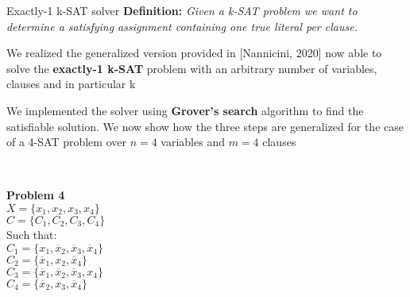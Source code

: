 		\begin{frame}{Exactly-1 k-SAT solver}
			\small
			\textbf{Definition:} \emph{Given a k-SAT problem we want to determine a satisfying assignment containing one true literal per clause.\\}
			
			\vspace{0.3cm}
			
			We realized the generalized version provided in [Nannicini, 2020] now able to solve the \textbf{exactly-1 k-SAT} problem with an arbitrary number of variables, clauses and in particular k \\
			
			\vspace{0.6cm}
			
			\begin{minipage}{0.5\textwidth}
				We implemented the solver using \textbf{Grover's search} algorithm to find the satisfiable solution. We now show how the three steps are generalized for the case of a 4-SAT problem over $n=4$ variables and $m=4$ clauses
			\end{minipage}\hspace{1cm}
			~
			\begin{minipage}{0.3\textwidth}
				\textbf{Problem 4}\\
				$X=\{x_1, x_2, x_3, x_4\}$\\
				$C=\{C_1, C_2, C_3, C_4\}$\\
				Such that:\\
				$C_1 = \{x_1, \overline{x}_2, \overline{x}_3, \overline{x}_4\}$\\
				$C_2 = \{\overline{x}_1, x_2, \overline{x}_4\}$\\
				$C_3 = \{\overline{x}_1, \overline{x}_2, \overline{x}_3, x_4\}$\\
				$C_4 = \{\overline{x}_2, x_3, \overline{x}_4\}$
			\end{minipage}
		\end{frame}
	
